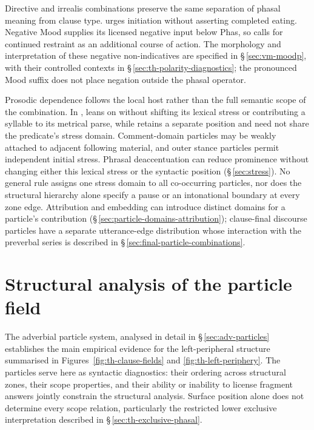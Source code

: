 Directive and irrealis combinations preserve the same separation of phasal
meaning from clause type.  
urges initiation without asserting completed eating. Negative Mood supplies
its licensed negative input below Phas, so  calls for
continued restraint as an additional course of action. The morphology and
interpretation of these negative non-indicatives are specified in
§\,\ref{sec:vm-moodp}, with their controlled contexts in
§\,\ref{sec:th-polarity-diagnostics}; the pronounced Mood suffix does not
place negation outside the phasal operator.

Prosodic dependence follows the local host rather than the full semantic
scope of the combination. In ,  leans
on  without shifting its lexical stress or contributing a
syllable to its metrical parse, while  retains a separate position
and need not share the predicate's stress domain.
Comment-domain particles may be weakly attached to adjacent following
material, and outer stance particles permit independent initial stress.
Phrasal deaccentuation can reduce prominence without changing either this
lexical stress or the syntactic position (§\,\ref{sec:stress}). No general
rule assigns one stress domain to all co-occurring particles, nor does the
structural hierarchy alone specify a pause or an intonational boundary at
every zone edge. Attribution and embedding can introduce distinct domains
for a particle's contribution
(§\,\ref{sec:particle-domains-attribution}); clause-final discourse particles
have a separate utterance-edge distribution whose interaction with the
preverbal series is described in
§\,\ref{sec:final-particle-combinations}.

\section{Structural analysis of the particle field}
\label{sec:th-particle-framework}

The adverbial particle system, analysed in detail in §\,\ref{sec:adv-particles}
establishes the main empirical evidence for
the left-peripheral structure summarised in Figures~\ref{fig:th-clause-fields}
and \ref{fig:th-left-periphery}. The particles serve here as syntactic
diagnostics: their ordering across structural zones, their scope properties,
and their ability or inability to license fragment answers jointly constrain
the structural analysis. Surface position alone does not
determine every scope relation, particularly the restricted lower exclusive
interpretation described in §\,\ref{sec:th-exclusive-phasal}.

